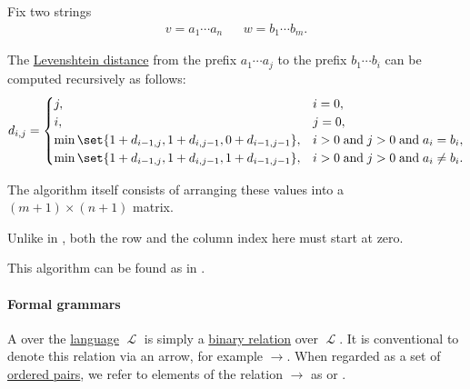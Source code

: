 \begin{algorithm}\label{alg:wagner_fisher}
  Fix two strings
  \begin{align*}
    v = a_1 \cdots a_n && w = b_1 \cdots b_m.
  \end{align*}

  The \hyperref[def:levenshtein_distance]{Levenshtein distance} from the prefix \( a_1 \cdots a_j \) to the prefix \( b_1 \cdots b_i \) can be computed recursively as follows:
  \begin{equation*}
    d_{i,j} = \begin{cases}
      j,                                                         &i = 0, \\
      i,                                                         &j = 0, \\
      \min\set{ 1 + d_{i-1,j}, 1 + d_{i,j-1}, 0 + d_{i-1,j-1} }, &i > 0 \T{and} j > 0 \T{and} a_i = b_i, \\
      \min\set{ 1 + d_{i-1,j}, 1 + d_{i,j-1}, 1 + d_{i-1,j-1} }, &i > 0 \T{and} j > 0 \T{and} a_i \neq b_i.
    \end{cases}
  \end{equation*}

  The algorithm itself consists of arranging these values into a \( (m + 1) \times (n + 1) \) matrix.
\end{algorithm}
\begin{comments}
  \item Unlike in , both the row and the column index here must start at zero.
  \item This algorithm can be found as  in \cite{notebook:code}.
\end{comments}

\paragraph{Formal grammars}

\begin{definition}\label{def:rewriting_system}
  A  over the \hyperref[def:formal_language/language]{language} \( \mscrL \) is simply a \hyperref[def:binary_relation]{binary relation} over \( \mscrL \). It is conventional to denote this relation via an arrow, for example \( {\to} \). When regarded as a set of \hyperref[def:ordered_tuple]{ordered pairs}, we refer to elements of the relation \( {\to} \) as  or .
\end{definition}

